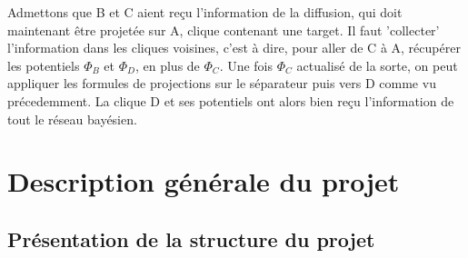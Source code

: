 \documentclass[a4paper]{article}
\begin{document}
Admettons que B et C aient reçu l'information de la diffusion, qui doit maintenant être projetée sur A, clique contenant une target. Il faut 'collecter' l'information dans les cliques voisines, c'est à dire, pour
aller de C à A, récupérer les potentiels $\Phi_{B}$ et $\Phi_{D}$, en plus de $\Phi_{C}$. Une fois $\Phi_{C}$ actualisé de la sorte, on peut appliquer les formules de projections sur le séparateur puis vers D 
comme vu précedemment. La clique D et ses potentiels ont alors bien reçu l'information de tout le réseau bayésien.

\section{Description générale du projet}
 \subsection{Présentation de la structure du projet}
 
\end{document}
